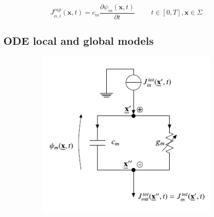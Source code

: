 \documentclass[a4paper]{article}
\begin{document}
\begin{equation}
J^{cap}_{\alpha,i}(\textbf{x},t) = c_m \frac{\partial \psi_m(\textbf{x},t)}{\partial t}  \hspace{1cm} t \in [0,T], \textbf{x} \in \Sigma
\end{equation}


\subsection{ODE local and global models}

\begin{figure}[H]
	\begin{minipage}{\linewidth}
		\centering
		\begin{minipage}{0.45\linewidth}
			\begin{figure}[H]
				\includegraphics[width=\linewidth]{ode_circuit.png}
				

\end{figure}
\end{minipage}
\end{minipage}
\end{figure}
\end{document}
